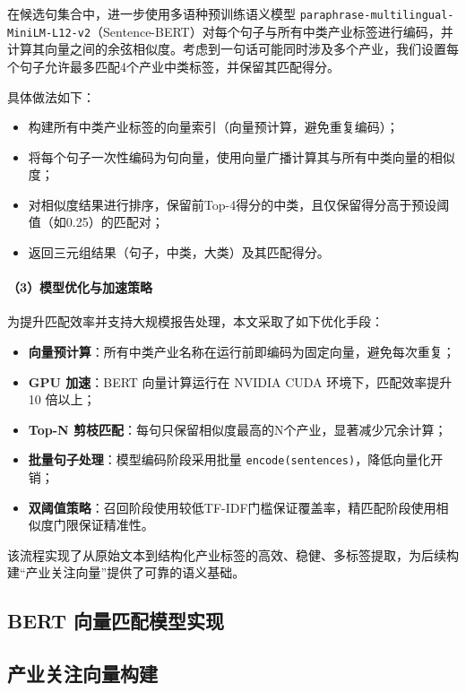 \documentclass[a4paper,11pt, fontset=fandol]{ctexart}
\begin{document}
在候选句集合中，进一步使用多语种预训练语义模型 \texttt{paraphrase-multilingual-MiniLM-L12-v2}（Sentence-BERT）对每个句子与所有中类产业标签进行编码，并计算其向量之间的余弦相似度。考虑到一句话可能同时涉及多个产业，我们设置每个句子允许最多匹配4个产业中类标签，并保留其匹配得分。

具体做法如下：
\begin{itemize}
    \item 构建所有中类产业标签的向量索引（向量预计算，避免重复编码）；
    \item 将每个句子一次性编码为句向量，使用向量广播计算其与所有中类向量的相似度；
    \item 对相似度结果进行排序，保留前Top-4得分的中类，且仅保留得分高于预设阈值（如0.25）的匹配对；
    \item 返回三元组结果（句子，中类，大类）及其匹配得分。
\end{itemize}

\paragraph{（3）模型优化与加速策略}

为提升匹配效率并支持大规模报告处理，本文采取了如下优化手段：
\begin{itemize}
    \item \textbf{向量预计算}：所有中类产业名称在运行前即编码为固定向量，避免每次重复；
    \item \textbf{GPU 加速}：BERT 向量计算运行在 NVIDIA CUDA 环境下，匹配效率提升 10 倍以上；
    \item \textbf{Top-N 剪枝匹配}：每句只保留相似度最高的N个产业，显著减少冗余计算；
    \item \textbf{批量句子处理}：模型编码阶段采用批量 \texttt{encode(sentences)}，降低向量化开销；
    \item \textbf{双阈值策略}：召回阶段使用较低TF-IDF门槛保证覆盖率，精匹配阶段使用相似度门限保证精准性。
\end{itemize}

该流程实现了从原始文本到结构化产业标签的高效、稳健、多标签提取，为后续构建“产业关注向量”提供了可靠的语义基础。

\subsection{BERT 向量匹配模型实现}

\subsection{产业关注向量构建}
\end{document}
